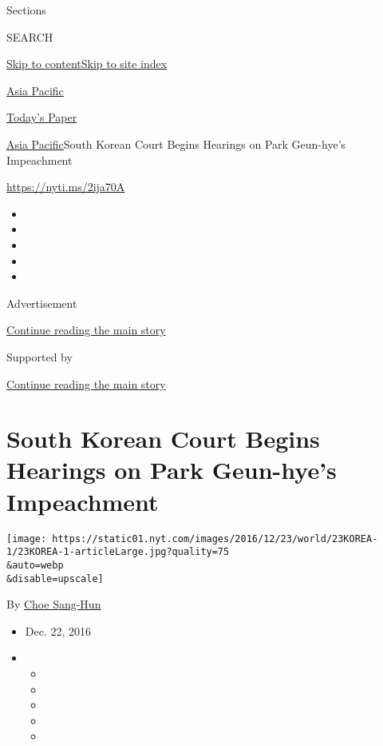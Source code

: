 Sections

SEARCH

\protect\hyperlink{site-content}{Skip to
content}\protect\hyperlink{site-index}{Skip to site index}

\href{https://www.nytimes.com/section/world/asia}{Asia Pacific}

\href{https://myaccount.nytimes.com/auth/login?response_type=cookie\&client_id=vi}{}

\href{https://www.nytimes.com/section/todayspaper}{Today's Paper}

\href{/section/world/asia}{Asia Pacific}\textbar{}South Korean Court
Begins Hearings on Park Geun-hye's Impeachment

\url{https://nyti.ms/2ija70A}

\begin{itemize}
\item
\item
\item
\item
\item
\end{itemize}

Advertisement

\protect\hyperlink{after-top}{Continue reading the main story}

Supported by

\protect\hyperlink{after-sponsor}{Continue reading the main story}

\hypertarget{south-korean-court-begins-hearings-on-park-geun-hyes-impeachment}{%
\section{South Korean Court Begins Hearings on Park Geun-hye's
Impeachment}\label{south-korean-court-begins-hearings-on-park-geun-hyes-impeachment}}

\texttt{[image: https://static01.nyt.com/images/2016/12/23/world/23KOREA-1/23KOREA-1-articleLarge.jpg?quality=75\\\&auto=webp\\\&disable=upscale]}

By \href{http://www.nytimes.com/by/choe-sang-hun}{Choe Sang-Hun}

\begin{itemize}
\item
  Dec. 22, 2016
\item
  \begin{itemize}
  \item
  \item
  \item
  \item
  \item
  \end{itemize}
\end{itemize}

